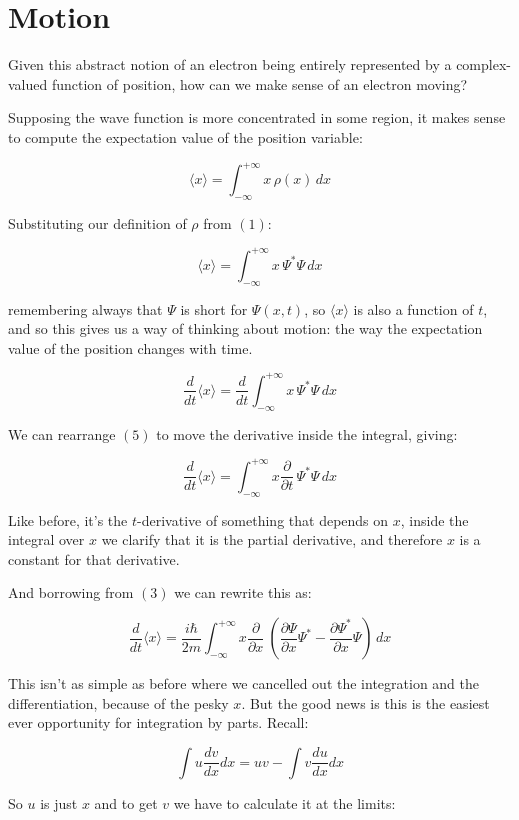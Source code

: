 \section{Motion}

Given this abstract notion of an electron being entirely represented by a complex-valued function of position, how can we make sense of an electron moving?

Supposing the wave function is more concentrated in some region, it makes sense to compute the expectation value of the position variable:

$$
\langle x \rangle =
\int_{-\infty}^{+\infty}
x \, \rho(x)
\,dx
$$

Substituting our definition of $\rho$ from $(1)$:

$$
\langle x \rangle =
\int_{-\infty}^{+\infty}
x \, \Psi^*\Psi
\,dx
$$

remembering always that $\Psi$ is short for $\Psi(x, t)$, so $\langle x \rangle$ is also a function of $t$, and so this gives us a way of thinking about motion: the way the expectation value of the position changes with time.

$$
\frac{d}{dt} \langle x \rangle =
\frac{d}{dt}
\int_{-\infty}^{+\infty}
x \, \Psi^*\Psi
\,dx
$$

We can rearrange $(5)$ to move the derivative inside the integral, giving:

$$
\frac{d}{dt} \langle x \rangle =
\int_{-\infty}^{+\infty}
x \frac{\partial}{\partial t}
\, \Psi^*\Psi
\,dx
$$

Like before, it's the $t$-derivative of something that depends on $x$, inside the integral over $x$ we clarify that it is the partial derivative, and therefore $x$ is a constant for that derivative.

And borrowing from $(3)$ we can rewrite this as:

$$
\frac{d}{dt} \langle x \rangle =
\frac{i \hbar}{2m}
\int_{-\infty}^{+\infty}
x
\frac{\partial}{\partial x} \
\left(
\frac{\partial \Psi}{\partial x}\Psi^*
- \frac{\partial \Psi^*}{\partial x}\Psi
\right)
\,dx
$$

This isn't as simple as before where we cancelled out the integration and the differentiation, because of the pesky $x$. But the good news is this is the easiest ever opportunity for integration by parts. Recall:

$$
\int
u
\frac{dv}{dx}
dx = uv -
\int
v
\frac{du}{dx}
dx
$$

So $u$ is just $x$ and to get $v$ we have to calculate it at the limits:

